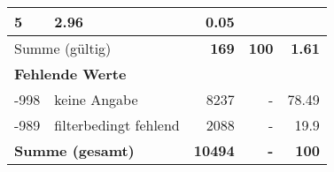 \begin{longtable}{lXrrr}
       \num{5} &
       \num[round-mode=places,round-precision=2]{2.96} &
         \num[round-mode=places,round-precision=2]{0.05} \\
     \midrule
     \multicolumn{2}{l}{Summe (gültig)} &
       \textbf{\num{169}} &
     \textbf{\num{100}} &
       \textbf{\num[round-mode=places,round-precision=2]{1.61}} \\
     \multicolumn{5}{l}{\textbf{Fehlende Werte}}\\
       -998 &
       keine Angabe &
         \num{8237} &
        - &
         \num[round-mode=places,round-precision=2]{78.49} \\
       -989 &
       filterbedingt fehlend &
         \num{2088} &
        - &
         \num[round-mode=places,round-precision=2]{19.9} \\
     \midrule
     \multicolumn{2}{l}{\textbf{Summe (gesamt)}} &
          \textbf{\num{10494}} &
        \textbf{-} &
        \textbf{\num{100}} \\
     \bottomrule
     \end{longtable}
     
